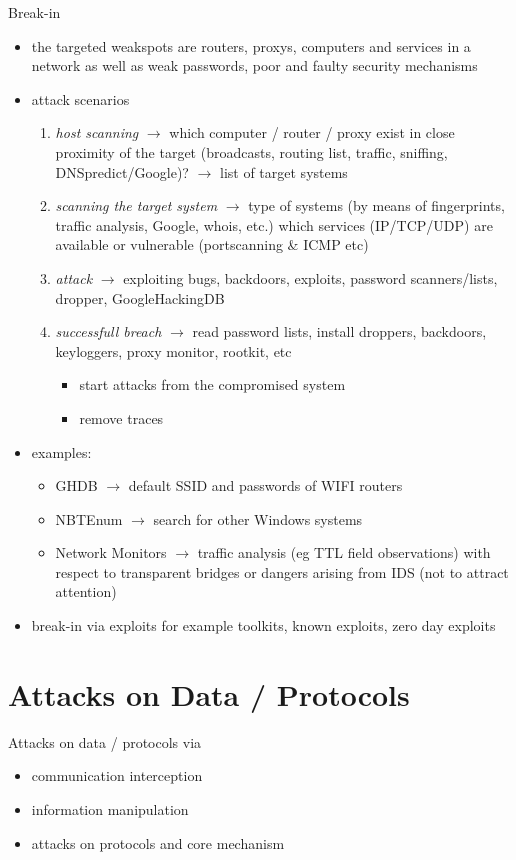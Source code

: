 \documentclass[11pt]{article}
\begin{document}
Break-in
\begin{itemize}
\item the targeted weakspots are routers, proxys, computers and services in a network as well as weak passwords, poor and faulty security mechanisms
\item attack scenarios
\begin{enumerate}
\item \emph{host scanning} \(\rightarrow\) which computer / router / proxy exist in close proximity of the target (broadcasts, routing list, traffic, sniffing, DNSpredict/Google)? \(\rightarrow\) list of target systems
\item \emph{scanning the target system} \(\rightarrow\) type of systems (by means of fingerprints, traffic analysis, Google, whois, etc.)  which services (IP/TCP/UDP) are available or vulnerable (portscanning \& ICMP etc)
\item \emph{attack} \(\rightarrow\) exploiting bugs, backdoors, exploits, password scanners/lists, dropper, GoogleHackingDB
\item \emph{successfull breach} \(\rightarrow\) read password lists, install droppers, backdoors, keyloggers, proxy monitor, rootkit, etc
\begin{itemize}
\item start attacks from the compromised system
\item remove traces
\end{itemize}
\end{enumerate}
\item examples:
\begin{itemize}
\item GHDB \(\rightarrow\) default SSID and passwords of WIFI routers
\item NBTEnum \(\rightarrow\) search for other Windows systems
\item Network Monitors \(\rightarrow\) traffic analysis (eg TTL field observations) with respect to transparent bridges or dangers arising from IDS (not to attract attention)
\end{itemize}
\item break-in via exploits for example toolkits, known exploits, zero day exploits
\end{itemize}

\section{Attacks on Data / Protocols}
\label{sec:org4725bbb}
Attacks on data / protocols via
\begin{itemize}
\item communication interception
\item information manipulation
\item attacks on protocols and core mechanism
\end{itemize}
\end{document}
